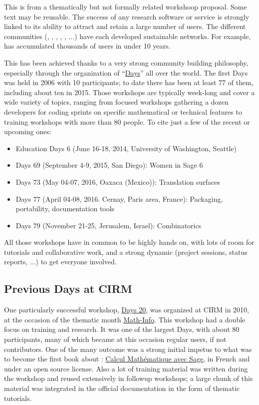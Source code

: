 \begin{oldpart}{This is from a thematically but not formally related workshoop proposal. Some text may be reusable.}
The success of any research software or service is strongly linked to
its ability to attract and retain a large number of users. The
different communities (\Sage, \GAP, \Pari, \Singular, \Jupyter, ...)
have each developed sustainable networks. For example, \Sage has
accumulated thousands of users in under 10 years.

This has been achieved thanks to a very strong community building
philosophy, especially through the organization of
“\href{https://wiki.sagemath.org/Workshops}{\Sage Days}” all over the
world. The first \Sage Days was held in 2006 with 10 participants; to
date there has been at least 77 of them, including about ten in
2015. Those workshops are typically week-long and cover a wide
variety of topics, ranging from focused workshops gathering a dozen
developers for coding sprints on specific mathematical or technical
features to training workshops with more than 80 people. To cite just
a few of the recent or upcoming ones:

\begin{itemize}
\item \Sage Education Days 6 (June 16-18, 2014, University of
  Washington, Seattle)
\item \Sage Days 69 (September 4-9, 2015, San Diego): Women in Sage 6
\item \Sage Days 73 (May 04-07, 2016, Oaxaca (Mexico)): Translation surfaces
\item \Sage Days 77 (April 04-08, 2016. Cernay, Paris area, France):
  Packaging, portability, documentation tools
\item \Sage Days 79 (November 21-25, Jerusalem, Israel): Combinatorics
\end{itemize}

All those workshops have in common to be highly hands on, with lots of
room for tutorials and collaborative work, and a strong dynamic
(project sessions, status reports, ...) to get everyone involved.

\subsection{Previous \Sage Days at CIRM}

One particularly successful workshop,
\href{https://www.lirmm.fr/arith/wiki/MathInfo2010/SageDays}{\Sage
  Days 20}, was organized at CIRM in 2010, at the occasion of the
thematic month
\href{https://www.lirmm.fr/arith/wiki/MathInfo2010/}{Math-Info}. This
workshop had a double focus on training and research. It was one of
the largest \Sage Days, with about 80 participants, many of which
became at this occasion regular \Sage users, if not contributors. One
of the many outcome was a strong initial impetus to what was to become
the first book about \Sage: \href{http://sagebook.gforge.inria.fr/}{Calcul Mathématique avec
Sage}, in French and under an open
source license. Also a lot of training material was written during the
workshop and reused extensively in followup workshops; a large chunk
of this material was integrated in the \Sage official documentation in
the form of thematic tutorials.


\end{oldpart}
